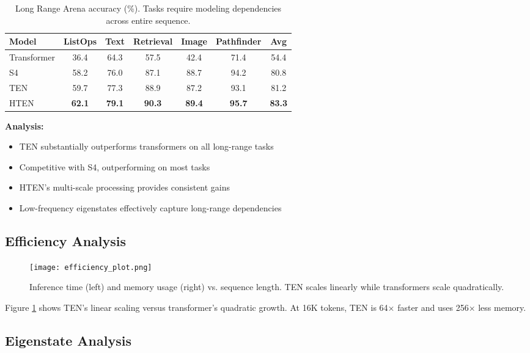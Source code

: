 \documentclass[11pt,letterpaper]{article}
\begin{document}
\begin{table}[h]
\centering
\caption{Long Range Arena accuracy (\%). Tasks require modeling dependencies across entire sequence.}
\label{tab:lra}
\begin{tabular}{lcccccc}
\toprule
\textbf{Model} & \textbf{ListOps} & \textbf{Text} & \textbf{Retrieval} & \textbf{Image} & \textbf{Pathfinder} & \textbf{Avg} \\
\midrule
Transformer & 36.4 & 64.3 & 57.5 & 42.4 & 71.4 & 54.4 \\
S4 & 58.2 & 76.0 & 87.1 & 88.7 & 94.2 & 80.8 \\
TEN & 59.7 & 77.3 & 88.9 & 87.2 & 93.1 & 81.2 \\
HTEN & \textbf{62.1} & \textbf{79.1} & \textbf{90.3} & \textbf{89.4} & \textbf{95.7} & \textbf{83.3} \\
\bottomrule
\end{tabular}
\end{table}

\textbf{Analysis:}
\begin{itemize}
    \item TEN substantially outperforms transformers on all long-range tasks
    \item Competitive with S4, outperforming on most tasks
    \item HTEN's multi-scale processing provides consistent gains
    \item Low-frequency eigenstates effectively capture long-range dependencies
\end{itemize}

\subsection{Efficiency Analysis}

\begin{figure}[h]
\centering
\texttt{[image: efficiency\_plot.png]}
\caption{Inference time (left) and memory usage (right) vs. sequence length. TEN scales linearly while transformers scale quadratically.}
\label{fig:efficiency}
\end{figure}

Figure \ref{fig:efficiency} shows TEN's linear scaling versus transformer's quadratic growth. At 16K tokens, TEN is 64× faster and uses 256× less memory.

\subsection{Eigenstate Analysis}
\end{document}
